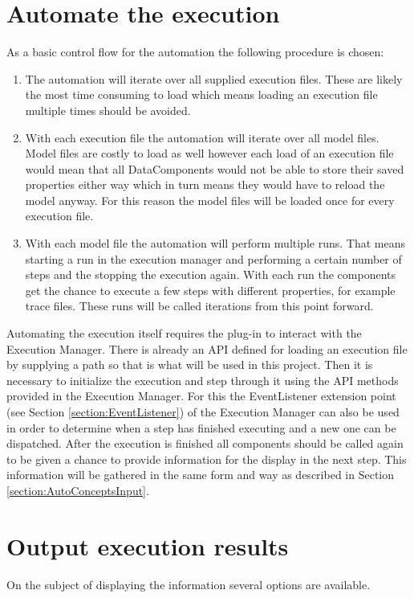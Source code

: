 \section{Automate the execution}
\label{section:AutoConceptsExecution}
As a basic control flow for the automation the following procedure is chosen:
\begin{enumerate}
 \item The automation will iterate over all supplied execution files. These are likely the most time consuming
to load which means loading an execution file multiple times should be avoided.
 \item With each execution file the automation will iterate over all model files. Model files are costly to load
as well however each load of an execution file would mean that all DataComponents would not be able to store their
saved properties either way which in turn means they would have to reload the model anyway. For this reason the model
files will be loaded once for every execution file.
 \item With each model file the automation will perform multiple runs. That means starting a run in the execution manager
and performing a certain number of steps and the stopping the execution again. With each run the components get the chance
to execute a few steps with different properties, for example trace files. These runs will be called iterations from this
point forward.
\end{enumerate}

Automating the execution itself requires the plug-in to interact with the Execution Manager.
There is already an \ac{API} defined for loading an execution file by supplying a path so that
is what will be used in this project.
Then it is necessary to initialize the execution and step through it using the \ac{API}
methods provided in the Execution Manager. For this the EventListener extension point (see Section \ref{section:EventListener}) of the 
Execution Manager can also be used in order to determine when a step has finished executing and
a new one can be dispatched.
After the execution is finished all components should be called again to be given
a chance to provide information for the display in the next step. This information
will be gathered in the same form and way as described in Section \ref{section:AutoConceptsInput}.


\section{Output execution results}
\label{section:AutoConceptsOutput}
On the subject of displaying the information several options are available.

